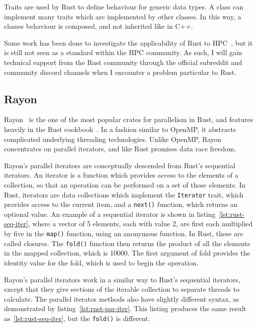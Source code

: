 Traits are used by Rust to define behaviour for generic data types. A class can implement many traits which are implemented by other classes. In this way, a classes behaviour is composed, and not inherited like in C++.

Some work has been done to investigate the applicability of Rust to HPC~\cite{bioinformatics, blanco2016}, but it is still not seen as a standard within the HPC community. As such, I will gain technical support from the Rust community through the official subreddit and community discord channels when I encounter a problem particular to Rust.

\subsection{Rayon}\label{sec:back-rayon}
Rayon~\cite{RustRayon} is the one of the most popular crates for parallelism in Rust, and features heavily in the Rust cookbook~\cite{RustCookPara}. In a fashion similar to OpenMP, it abstracts complicated underlying threading technologies. Unlike OpenMP, Rayon concentrates on parallel iterators, and like Rust promises data race freedom.

Rayon's parallel iterators are conceptually descended from Rust's sequential iterators. An iterator is a function which provides access to the elements of a collection, so that an operation can be performed on a set of those elements. In Rust, iterators are data collections which implement the \texttt{Iterator} trait, which provides access to the current item, and a \texttt{next()} function, which returns an optional value.
An example of a sequential iterator is shown in listing~\ref{lst:rust-seq-iter}, where a vector of 5 elements, each with value 2, are first each multiplied by five in the \texttt{map()} function, using an anonymous function. In Rust, these are called closures. The \texttt{fold()} function then returns the product of all the elements in the mapped collection, which is 10000. The first argument of fold provides the identity value for the fold, which is used to begin the operation.

Rayon's parallel iterators work in a similar way to Rust's sequential iterators, except that they give sections of the iterable collection to separate threads to calculate. The parallel iterator methods also have slightly different syntax, as demonstrated by listing~\ref{lst:rust-par-iter}. This listing produces the same result as~\ref{lst:rust-seq-iter}, but the \texttt{fold()} is different.


